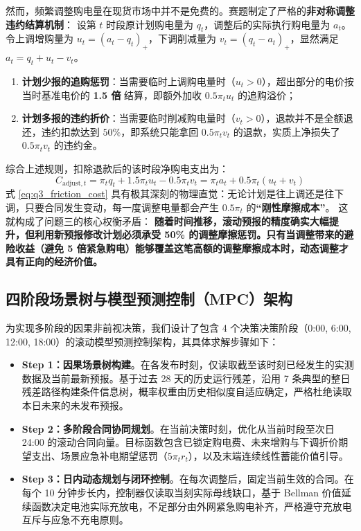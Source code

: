 \documentclass[withoutpreface]{cumcmthesis}
\begin{document}
然而，频繁调整购电量在现货市场中并不是免费的。赛题制定了严格的\textbf{非对称调整违约结算机制}：
设第 $t$ 时段原计划购电量为 $q_t$，调整后的实际执行购电量为 $a_t$。令上调增购量为 $u_t = (a_t - q_t)_+$，下调削减量为 $v_t = (q_t - a_t)_+$，显然满足 $a_t = q_t + u_t - v_t$。
\begin{enumerate}
    \item \textbf{计划少报的追购惩罚}：当需要临时上调购电量时（$u_t > 0$），超出部分的电价按当时基准电价的 \textbf{1.5 倍} 结算，即额外加收 $0.5\pi_t u_t$ 的追购溢价；
    \item \textbf{计划多报的违约折价}：当需要临时削减购电量时（$v_t > 0$），退款并不是全额退还，违约扣款达到 $50\%$，即系统只能拿回 $0.5\pi_t v_t$ 的退款，实质上净损失了 $0.5\pi_t v_t$ 的违约金。
\end{enumerate}
综合上述规则，扣除退款后的该时段净购电支出为：
\begin{equation}
    C_{\text{adjust}, t} = \pi_t q_t + 1.5\pi_t u_t - 0.5\pi_t v_t = \pi_t a_t + 0.5\pi_t (u_t + v_t) \label{eq:q3_friction_cost}
\end{equation}
式 \eqref{eq:q3_friction_cost} 具有极其深刻的物理直觉：无论计划是往上调还是往下调，只要合同发生变动，每一度调整电量都会产生 $0.5\pi_t$ 的\textbf{“刚性摩擦成本”}。
这就构成了问题三的核心权衡矛盾：
\textbf{随着时间推移，滚动预报的精度确实大幅提升，但利用新预报修改计划必须承受 50\% 的调整摩擦惩罚。只有当调整带来的避险收益（避免 5 倍紧急购电）能够覆盖这笔高额的调整摩擦成本时，动态调整才具有正向的经济价值。}

\subsection{四阶段场景树与模型预测控制（MPC）架构}
为实现多阶段的因果非前视决策，我们设计了包含 4 个决策决策阶段（0:00, 6:00, 12:00, 18:00）的滚动模型预测控制架构，其具体求解步骤如下：

\begin{itemize}
    \item \textbf{Step 1：因果场景树构建}。在各发布时刻，仅读取截至该时刻已经发生的实测数据及当前最新预报。基于过去 28 天的历史运行残差，沿用 7 条典型的整日残差路径构建条件信息树，概率权重由历史相似度自适应确定，严格杜绝读取本日未来的未发布预报。
    \item \textbf{Step 2：多阶段合同协同规划}。在当前决策时刻，优化从当前时段至次日 24:00 的滚动合同向量。目标函数包含已锁定购电费、未来增购与下调折价期望支出、场景应急补电期望惩罚（$5\pi_t r_t$），以及末端连续线性蓄能价值引导。
    \item \textbf{Step 3：日内动态规划与闭环控制}。在每次调整后，固定当前生效的合同。在每个 10 分钟步长内，控制器仅读取当刻实际母线缺口，基于 Bellman 价值延续函数决定电池实际充放电，不足部分由外网紧急购电补齐，严格遵守充放电互斥与应急不充电原则。
\end{itemize}
\end{document}
